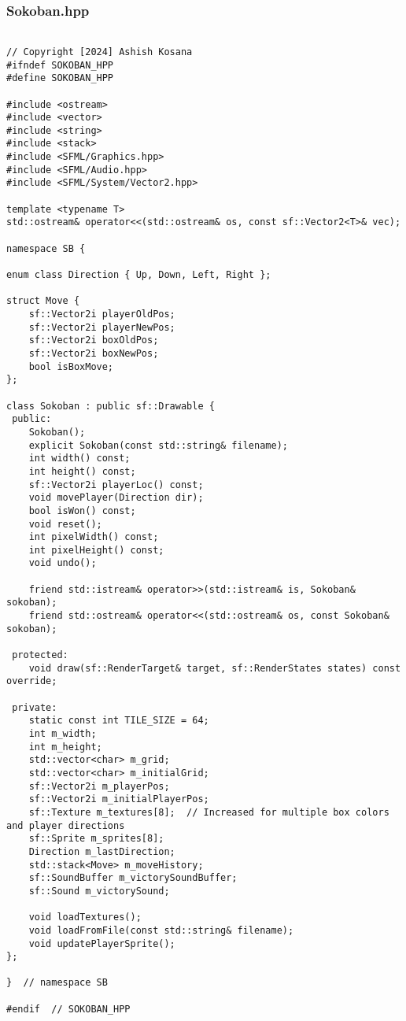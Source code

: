 \documentclass[12pt]{article}
\begin{document}
\subsubsection{Sokoban.hpp}
\begin{lstlisting}[style=cppcode]

// Copyright [2024] Ashish Kosana
#ifndef SOKOBAN_HPP
#define SOKOBAN_HPP

#include <ostream>
#include <vector>
#include <string>
#include <stack>
#include <SFML/Graphics.hpp>
#include <SFML/Audio.hpp>
#include <SFML/System/Vector2.hpp>

template <typename T>
std::ostream& operator<<(std::ostream& os, const sf::Vector2<T>& vec);

namespace SB {

enum class Direction { Up, Down, Left, Right };

struct Move {
    sf::Vector2i playerOldPos;
    sf::Vector2i playerNewPos;
    sf::Vector2i boxOldPos;
    sf::Vector2i boxNewPos;
    bool isBoxMove;
};

class Sokoban : public sf::Drawable {
 public:
    Sokoban();
    explicit Sokoban(const std::string& filename);
    int width() const;
    int height() const;
    sf::Vector2i playerLoc() const;
    void movePlayer(Direction dir);
    bool isWon() const;
    void reset();
    int pixelWidth() const;
    int pixelHeight() const;
    void undo();

    friend std::istream& operator>>(std::istream& is, Sokoban& sokoban);
    friend std::ostream& operator<<(std::ostream& os, const Sokoban& sokoban);

 protected:
    void draw(sf::RenderTarget& target, sf::RenderStates states) const override;

 private:
    static const int TILE_SIZE = 64;
    int m_width;
    int m_height;
    std::vector<char> m_grid;
    std::vector<char> m_initialGrid;
    sf::Vector2i m_playerPos;
    sf::Vector2i m_initialPlayerPos;
    sf::Texture m_textures[8];  // Increased for multiple box colors and player directions
    sf::Sprite m_sprites[8];
    Direction m_lastDirection;
    std::stack<Move> m_moveHistory;
    sf::SoundBuffer m_victorySoundBuffer;
    sf::Sound m_victorySound;

    void loadTextures();
    void loadFromFile(const std::string& filename);
    void updatePlayerSprite();
};

}  // namespace SB

#endif  // SOKOBAN_HPP

\end{lstlisting}
\end{document}
